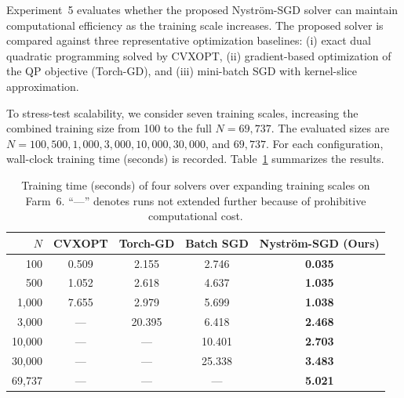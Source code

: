 Experiment~5 evaluates whether the proposed Nystr\"{o}m-SGD solver can maintain computational efficiency as the training scale increases. The proposed solver is compared against three representative optimization baselines: (i) exact dual quadratic programming solved by CVXOPT, (ii) gradient-based optimization of the QP objective (Torch-GD), and (iii) mini-batch SGD with kernel-slice approximation.

To stress-test scalability, we consider seven training scales, increasing the combined training size from 100 to the full $N=69{,}737$. The evaluated sizes are $N=100, 500, 1{,}000, 3{,}000, 10{,}000, 30{,}000$, and $69{,}737$.
For each configuration, wall-clock training time (seconds) is recorded. Table~\ref{tab:scalability_results} summarizes the results.

\begin{table}[ht]
\centering
\caption{Training time (seconds) of four solvers over expanding training scales on Farm~6. ``---'' denotes runs not extended further because of prohibitive computational cost.}
{\small
\setlength{\tabcolsep}{2.6mm}
\begin{tabular}{rcccc}
\toprule
$N$ & CVXOPT & Torch-GD & Batch SGD & Nystr\"{o}m-SGD (Ours) \\
\midrule
100      & 0.509 & 2.155 & 2.746 & \textbf{0.035} \\
500      & 1.052 & 2.618 & 4.637 & \textbf{1.035} \\
1{,}000  & 7.655 & 2.979 & 5.699 & \textbf{1.038} \\
3{,}000  & --- & 20.395 & 6.418 & \textbf{2.468} \\
10{,}000 & --- & --- & 10.401 & \textbf{2.703} \\
30{,}000 & --- & --- & 25.338 & \textbf{3.483} \\
69{,}737 & --- & --- & --- & \textbf{5.021} \\
\bottomrule
\end{tabular}
}
\label{tab:scalability_results}
\end{table}


